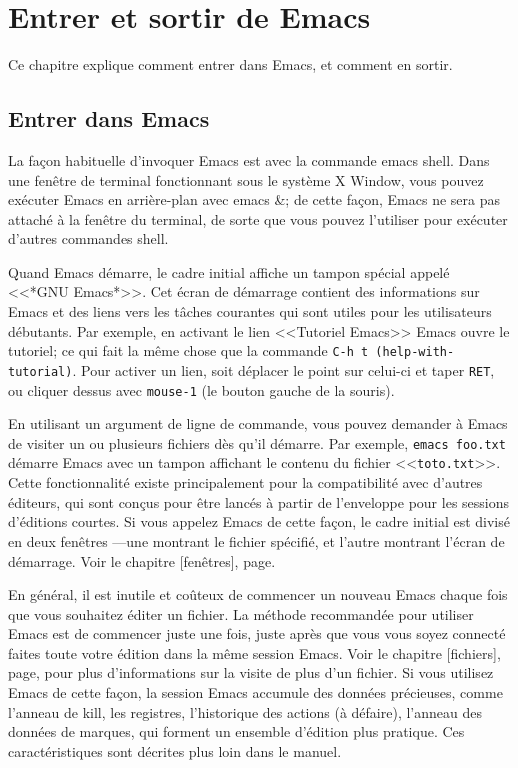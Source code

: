 \chapter{Entrer et sortir de Emacs}
Ce chapitre explique comment entrer dans Emacs, et comment en
sortir.\par

\section{Entrer dans Emacs}
La façon habituelle d'invoquer Emacs est avec la commande emacs
shell. Dans une fenêtre de terminal fonctionnant sous le système X
Window, vous pouvez exécuter Emacs en arrière-plan avec emacs \&; de
cette façon, Emacs ne sera pas attaché à la fenêtre du terminal, de
sorte que vous pouvez l'utiliser pour exécuter d'autres commandes
shell.\par 

Quand Emacs démarre, le cadre initial affiche un tampon spécial appelé
<<*GNU Emacs*>>. Cet écran de démarrage contient des informations sur
Emacs et des liens vers les tâches courantes qui sont utiles pour les
utilisateurs débutants. Par exemple, en activant le lien <<Tutoriel
Emacs>> Emacs ouvre le tutoriel; ce qui fait la même chose que la
commande \texttt{C-h t (help-with-tutorial)}. Pour activer un lien,
soit déplacer le point sur celui-ci et taper \texttt{RET}, ou cliquer
dessus avec \texttt{mouse-1} (le bouton gauche de la souris).\par  

En utilisant un argument de ligne de commande, vous pouvez demander
à Emacs de visiter un ou plusieurs fichiers dès qu'il démarre. Par
exemple, \texttt{emacs foo.txt} démarre Emacs avec un tampon affichant
le contenu du fichier <<\texttt{toto.txt}>>. Cette fonctionnalité
existe principalement pour la compatibilité avec d'autres éditeurs,
qui sont conçus pour être lancés à partir de l'enveloppe pour les
sessions d'éditions courtes. Si vous appelez Emacs de cette façon, le
cadre initial est divisé en deux fenêtres ---une montrant le fichier
spécifié, et l'autre montrant l'écran de démarrage. Voir le
chapitre [fenêtres], page.\par

En général, il est inutile et coûteux de commencer un nouveau Emacs
chaque fois que vous souhaitez éditer un fichier. La méthode
recommandée pour utiliser Emacs est de commencer juste une fois, juste
après que vous vous soyez connecté faites toute votre édition dans la
même session Emacs. Voir le chapitre [fichiers],
page, pour plus d'informations sur la visite de plus
d'un fichier. Si vous utilisez Emacs de cette façon, la session Emacs
accumule des données précieuses, comme l'anneau de kill, les
registres, l'historique des actions (à défaire), l'anneau des données
de marques, qui forment un ensemble d'édition plus pratique. Ces
caractéristiques sont décrites plus loin dans le manuel.\par 

